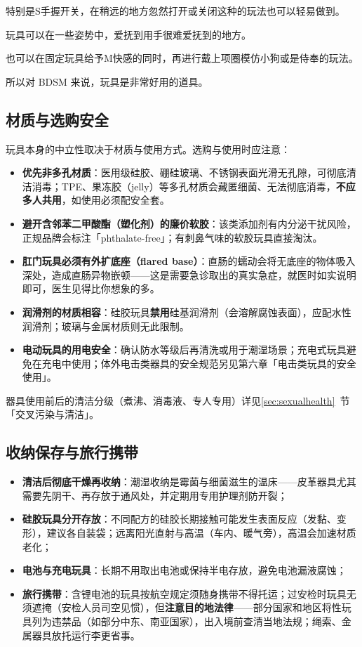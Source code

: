 \documentclass[12pt,UTF8]{ctexbook}
\begin{document}
特别是S手握开关，在稍远的地方忽然打开或关闭这种的玩法也可以轻易做到。

玩具可以在一些姿势中，爱抚到用手很难爱抚到的地方。

也可以在固定玩具给予M快感的同时，再进行戴上项圈模仿小狗或是侍奉的玩法。

所以对 BDSM 来说，玩具是非常好用的道具。

\subsection{材质与选购安全}

玩具本身的中立性取决于材质与使用方式。选购与使用时应注意：

\begin{itemize}
\item \textbf{优先非多孔材质}：医用级硅胶、硼硅玻璃、不锈钢表面光滑无孔隙，可彻底清洁消毒；TPE、果冻胶（jelly）等多孔材质会藏匿细菌、无法彻底消毒，\textbf{不应多人共用}，如使用必须配安全套。
\item \textbf{避开含邻苯二甲酸酯（塑化剂）的廉价软胶}：该类添加剂有内分泌干扰风险，正规品牌会标注「phthalate-free」；有刺鼻气味的软胶玩具直接淘汰。
\item \textbf{肛门玩具必须有外扩底座（flared base）}：直肠的蠕动会将无底座的物体吸入深处，造成直肠异物嵌顿——这是需要急诊取出的真实急症，就医时如实说明即可，医生见得比你想象的多。
\item \textbf{润滑剂的材质相容}：硅胶玩具\textbf{禁用}硅基润滑剂（会溶解腐蚀表面），应配水性润滑剂；玻璃与金属材质则无此限制。
\item \textbf{电动玩具的用电安全}：确认防水等级后再清洗或用于潮湿场景；充电式玩具避免在充电中使用；体外电击类器具的安全规范另见第六章「电击类玩具的安全使用」。
\end{itemize}

器具使用前后的清洁分级（煮沸、消毒液、专人专用）详见\ref{sec:sexualhealth}~节「交叉污染与清洁」。

\subsection{收纳保存与旅行携带}

\begin{itemize}
\item \textbf{清洁后彻底干燥再收纳}：潮湿收纳是霉菌与细菌滋生的温床——皮革器具尤其需要先阴干、再存放于通风处，并定期用专用护理剂防开裂；
\item \textbf{硅胶玩具分开存放}：不同配方的硅胶长期接触可能发生表面反应（发黏、变形），建议各自装袋；远离阳光直射与高温（车内、暖气旁），高温会加速材质老化；
\item \textbf{电池与充电玩具}：长期不用取出电池或保持半电存放，避免电池漏液腐蚀；
\item \textbf{旅行携带}：含锂电池的玩具按航空规定须随身携带不得托运；过安检时玩具无须遮掩（安检人员司空见惯），但\textbf{注意目的地法律}——部分国家和地区将性玩具列为违禁品（如部分中东、南亚国家），出入境前查清当地法规；绳索、金属器具放托运行李更省事。
\end{itemize}
\end{document}
